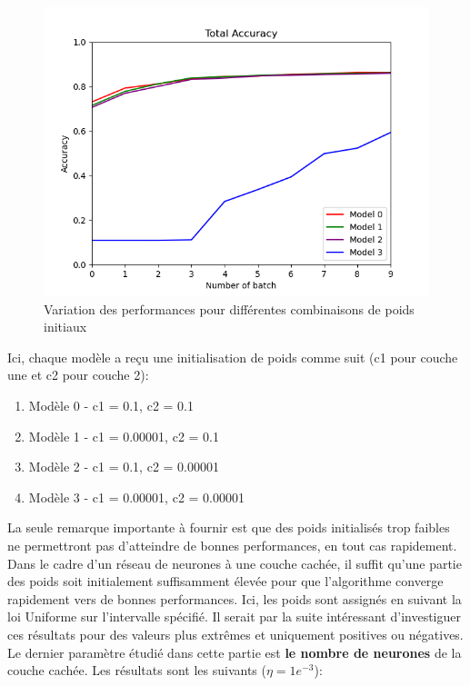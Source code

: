 \documentclass[a4paper]{article}
\begin{document}
		\begin{figure}[!h]
			\centering
			\includegraphics[width=.8\textwidth]{Fig_acc_p2_weight.png}\hfill
			\caption{Variation des performances pour différentes combinaisons de poids initiaux}	
		\end{figure}

Ici, chaque modèle a reçu une initialisation de poids comme suit (c1 pour couche une et c2 pour couche 2): 
	
	\begin{enumerate}
	 \item Modèle 0 - c1 = 0.1, c2 = 0.1
	 \item Modèle 1 - c1 = 0.00001, c2 = 0.1
	 \item Modèle 2 - c1 = 0.1, c2 = 0.00001
	 \item Modèle 3 - c1 = 0.00001, c2 = 0.00001
	\end{enumerate}

	La seule remarque importante à fournir est que des poids initialisés trop faibles ne permettront pas d'atteindre de bonnes performances, en tout cas rapidement. Dans le cadre d'un réseau de neurones à une couche cachée, il suffit qu'une partie des poids soit initialement suffisamment élevée pour que l'algorithme converge rapidement vers de bonnes performances. Ici, les poids sont assignés en suivant la loi Uniforme sur l'intervalle spécifié. Il serait par la suite intéressant d'investiguer ces résultats pour des valeurs plus extrêmes et uniquement positives ou négatives.\\
	
	 \newpage
	Le dernier paramètre étudié dans cette partie est \textbf{le nombre de neurones} de la couche cachée. Les résultats sont les suivants ($\eta = 1e^{-3}$): 
\end{document}
